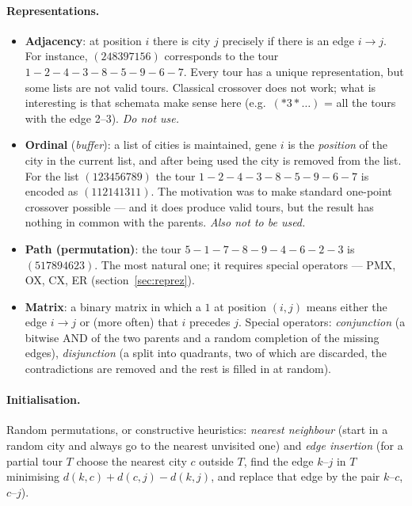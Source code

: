 \documentclass[11pt,a4paper]{article}
\theoremstyle{definition}
\begin{document}
\paragraph{Representations.}
\begin{itemize}
\item \textbf{Adjacency}: at position $i$ there is city $j$ precisely if there
  is an edge $i \to j$. For instance, $(248397156)$ corresponds to the tour
  $1{-}2{-}4{-}3{-}8{-}5{-}9{-}6{-}7$. Every tour has a unique representation,
  but some lists are not valid tours. Classical crossover does not work; what is
  interesting is that schemata make sense here (e.g.\ $(*3*\ldots)$ = all the
  tours with the edge 2--3). \emph{Do not use.}
\item \textbf{Ordinal} (\emph{buffer}): a list of cities is maintained, gene $i$
  is the \emph{position} of the city in the current list, and after being used
  the city is removed from the list. For the list $(123456789)$ the tour
  $1{-}2{-}4{-}3{-}8{-}5{-}9{-}6{-}7$ is encoded as $(112141311)$. The
  motivation was to make standard one-point crossover possible --- and it does
  produce valid tours, but the result has nothing in common with the parents.
  \emph{Also not to be used.}
\item \textbf{Path (permutation)}: the tour
  $5{-}1{-}7{-}8{-}9{-}4{-}6{-}2{-}3$ is $(517894623)$. The most natural one; it
  requires special operators --- PMX, OX, CX, ER
  (section~\ref{sec:reprez}).
\item \textbf{Matrix}: a binary matrix in which a $1$ at position $(i,j)$ means
  either the edge $i \to j$ or (more often) that $i$ precedes $j$. Special
  operators: \emph{conjunction} (a bitwise AND of the two parents and a random
  completion of the missing edges), \emph{disjunction} (a split into quadrants,
  two of which are discarded, the contradictions are removed and the rest is
  filled in at random).
\end{itemize}

\paragraph{Initialisation.} Random permutations, or constructive heuristics:
\emph{nearest neighbour} (start in a random city and always go to the nearest
unvisited one) and \emph{edge insertion} (for a partial tour $T$ choose the
nearest city $c$ outside $T$, find the edge $k$--$j$ in $T$ minimising
$d(k,c) + d(c,j) - d(k,j)$, and replace that edge by the pair $k$--$c$,
$c$--$j$).
\end{document}
